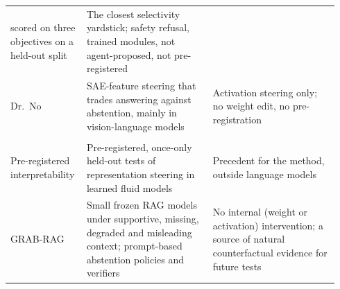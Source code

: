 \begin{longtable}{@{}L{0.2\linewidth}L{0.37\linewidth}L{0.37\linewidth}@{}}
scored on three objectives on a held-out split & The closest selectivity yardstick; safety refusal, trained modules,
not agent-proposed, not pre-registered \\
Dr.\ No \citep{hasanov2026drno} & SAE-feature steering that trades answering against abstention, mainly in
vision-language models & Activation steering only; no weight edit, no pre-registration \\
\addlinespace
{} \\*
Pre-registered interpretability \citep{readablenotsteerable2026} & Pre-registered, once-only held-out tests of
representation steering in learned fluid models & Precedent for the method, outside language models \\
GRAB-RAG \citep{setiawan2026grabrag} & Small frozen RAG models under supportive, missing, degraded and misleading
context; prompt-based abstention policies and verifiers & No internal (weight or activation) intervention; a source
of natural counterfactual evidence for future tests \\
\end{longtable}
\endgroup
